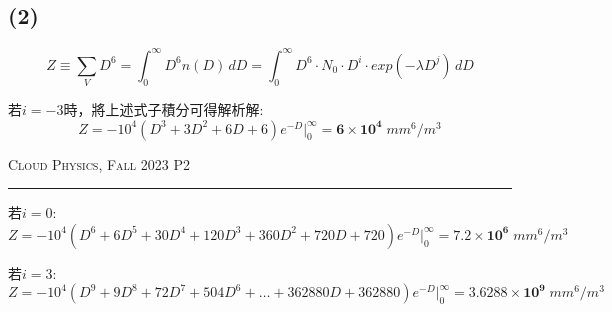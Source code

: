 \documentclass{article}
\begin{document}
\begin{CJK*}{UTF8}{bsmi}
\subsection*{(2)}
    \begin{large}
        \begin{center}
            \begin{displaymath}
                Z \equiv \sum\limits_{V}D^6 = \int_{0}^{\infty} D^6n(D) \,dD = \int_{0}^{\infty} D^6 \cdot N_0 \cdot D^i \cdot exp(-\lambda D^j) \,dD
            \end{displaymath}
        \end{center}

        \bigskip

        若$i = -3$時，將上述式子積分可得解析解:
            \begin{displaymath}
                Z = -10^4(D^3 + 3D^2 + 6D + 6)e^{-D}\bigg|^{\infty}_{0} = \mathbf{6 \times 10^4}\; mm^6/m^3
            \end{displaymath}

        \end{large}
        \newpage

\thispagestyle{empty}
\hfill {\scshape \large Cloud Physics, Fall 2023 } \hfill {\scshape P2}
\smallskip
\hrule
\bigskip
\bigskip
\bigskip
    
    \begin{large}
        若$i = 0$:
        \begin{displaymath}
            Z = -10^4(D^6 + 6D^5 + 30D^4 + 120D^3 + 360D^2 + 720D +720)e^{-D}\bigg|^{\infty}_{0} = \mathbf{7.2 \times 10^6}\; mm^6/m^3
        \end{displaymath}

        若$i = 3$:
        \begin{displaymath}
            Z = -10^4(D^9 + 9D^8 + 72D^7 + 504D^6 + \dots + 362880D + 362880)e^{-D}\bigg|^{\infty}_{0} = \mathbf{3.6288 \times 10^9}\; mm^6/m^3
        \end{displaymath}

    \end{large}

\bigskip


\end{CJK*}
\end{document}
